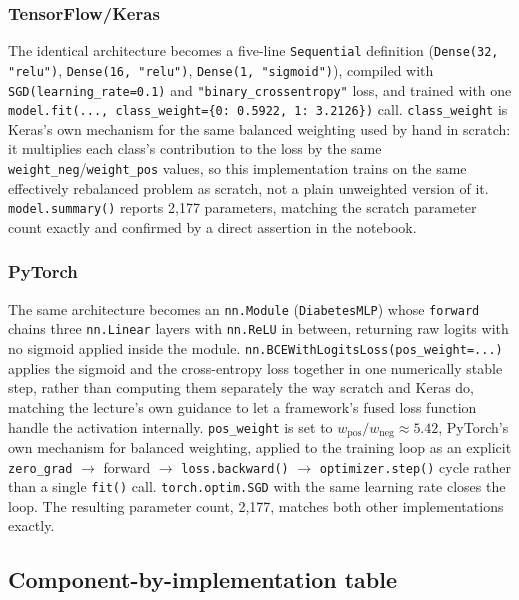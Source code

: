 \documentclass[11pt]{article}
\newcommand{\code}[1]{\texttt{#1}}
\begin{document}
\subsubsection{TensorFlow/Keras}

The identical architecture becomes a five-line \code{Sequential} definition
(\code{Dense(32, "relu")}, \code{Dense(16, "relu")}, \code{Dense(1,
"sigmoid")}), compiled with \code{SGD(learning\_rate=0.1)} and
\code{"binary\_crossentropy"} loss, and trained with one \code{model.fit(...,
class\_weight=\{0: 0.5922, 1: 3.2126\})} call. \code{class\_weight} is Keras's
own mechanism for the same balanced weighting used by hand in scratch: it
multiplies each class's contribution to the loss by the same
\verb|weight_neg|/\verb|weight_pos| values, so this implementation trains on
the same effectively rebalanced problem as scratch, not a plain unweighted
version of it. \code{model.summary()} reports 2,177 parameters, matching the
scratch parameter count exactly and confirmed by a direct assertion in the
notebook.

\subsubsection{PyTorch}

The same architecture becomes an \code{nn.Module} (\code{DiabetesMLP}) whose
\code{forward} chains three \code{nn.Linear} layers with \code{nn.ReLU} in
between, returning raw logits with no sigmoid applied inside the module.
\code{nn.BCEWithLogitsLoss(pos\_weight=...)} applies the sigmoid and the
cross-entropy loss together in one numerically stable step, rather than
computing them separately the way scratch and Keras do, matching the
lecture's own guidance to let a framework's fused loss function handle the
activation internally. \code{pos\_weight} is set to
$w_{\text{pos}} / w_{\text{neg}} \approx 5.42$, PyTorch's own mechanism for
balanced weighting, applied to the training loop as an explicit
\code{zero\_grad} $\to$ forward $\to$ \code{loss.backward()} $\to$
\code{optimizer.step()} cycle rather than a single \code{fit()} call.
\code{torch.optim.SGD} with the same learning rate closes the loop. The
resulting parameter count, 2,177, matches both other implementations exactly.

\subsection{Component-by-implementation table}
\end{document}
